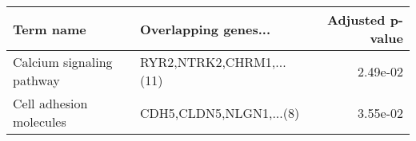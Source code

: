 \begin{tabular}{llr}
\toprule
                Term name &     Overlapping genes... &  Adjusted p-value \\
\midrule
Calcium signaling pathway & RYR2,NTRK2,CHRM1,...(11) &          2.49e-02 \\
  Cell adhesion molecules &  CDH5,CLDN5,NLGN1,...(8) &          3.55e-02 \\
\bottomrule
\end{tabular}
